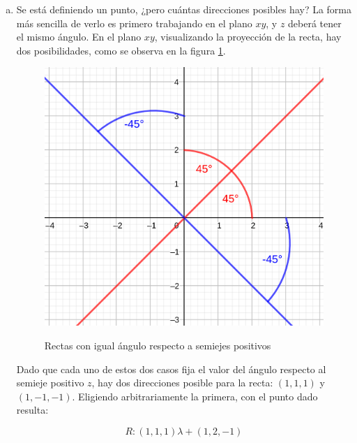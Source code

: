 \documentclass{article}
\begin{document}
\begin{enumerate}[(a)]
\begin{equation}
\tcboxmath[colback=orange!25!white,colframe=orange, title=Recta única]
{ \left\{ \begin{array}{llr}
6x + &7y &= 0 \\
&5y - 6z &= 0
\end{array} \right. }
\end{equation}

\item Se está definiendo un punto, ¿pero cuántas direcciones posibles hay? La forma más sencilla de verlo es primero trabajando en el plano $xy$, y $z$ deberá tener el mismo ángulo. En el plano $xy$, visualizando la proyección de la recta, hay dos posibilidades, como se observa en la figura \ref{fig:1-2-b}.

\begin{figure}[ht]
\caption{Rectas con igual ángulo respecto a semiejes positivos}
\includegraphics[scale=1]{img/ejercicios/1/2-b.png} 
\centering
\label{fig:1-2-b}
\end{figure}

Dado que cada uno de estos dos casos fija el valor del ángulo respecto al semieje positivo $z$, hay dos direcciones posible para la recta: $(1, 1, 1)$ y $(1, -1, -1)$. Eligiendo arbitrariamente la primera, con el punto dado resulta:

\begin{equation}
R: (1, 1, 1) \lambda + (1, 2, -1) 
\end{equation}


\end{enumerate}
\end{document}
